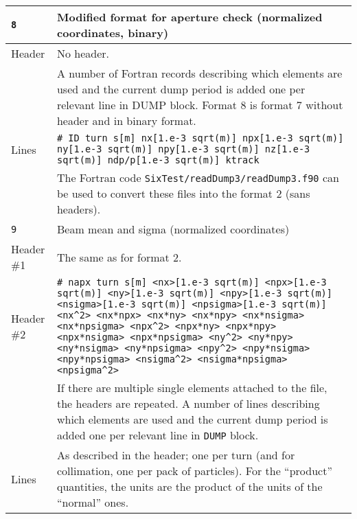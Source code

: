 \begin{center}
\begin{longtable}{|p{1.8cm}|p{13.8cm}|}
            \rowcolor{blue!15}
            \texttt{8} & Modified format for aperture check (normalized coordinates, binary)\\
            \hline
            Header  & No header.\vspace{1mm} \\
                    & A number of Fortran records describing which elements are used and the current dump period is added one per relevant line in DUMP block. Format 8 is format 7 without header and in binary format.\\
            \hline
            Lines   & \texttt{\# ID turn s[m] nx[1.e-3 sqrt(m)] npx[1.e-3 sqrt(m)] ny[1.e-3 sqrt(m)] npy[1.e-3 sqrt(m)] nz[1.e-3 sqrt(m)] ndp/p[1.e-3 sqrt(m)] ktrack}\vspace{1mm} \\
                    & The Fortran code \texttt{SixTest/readDump3/readDump3.f90} can be used to convert these files into the format 2 (sans headers). \\
            \hline
            
            \rowcolor{blue!15}
            \texttt{9} & Beam mean and sigma (normalized coordinates) \\
            \hline
            Header \#1 & The same as for format 2.\\
            \hline
            Header \#2 & \texttt{\# napx turn s[m] <nx>[1.e-3 sqrt(m)] <npx>[1.e-3 sqrt(m)] <ny>[1.e-3 sqrt(m)] <npy>[1.e-3 sqrt(m)] <nsigma>[1.e-3 sqrt(m)] <npsigma>[1.e-3 sqrt(m)] <nx\^{}2> <nx*npx> <nx*ny> <nx*npy> <nx*nsigma> <nx*npsigma> <npx\^{}2> <npx*ny> <npx*npy> <npx*nsigma> <npx*npsigma> <ny\^{}2> <ny*npy> <ny*nsigma> <ny*npsigma> <npy\^{}2> <npy*nsigma> <npy*npsigma> <nsigma\^{}2> <nsigma*npsigma> <npsigma\^{}2>}\vspace{1mm}\\
                       & If there are multiple single elements attached to the file, the headers are repeated. A number of lines describing which elements are used and the current dump period is added one per relevant line in \texttt{DUMP} block.\\
            \hline
            Lines      & As described in the header; one per turn (and for collimation, one per pack of particles). For the ``product'' quantities, the units are the product of the units of the ``normal'' ones. \\
            \hline
        \end{longtable}
\end{center}

